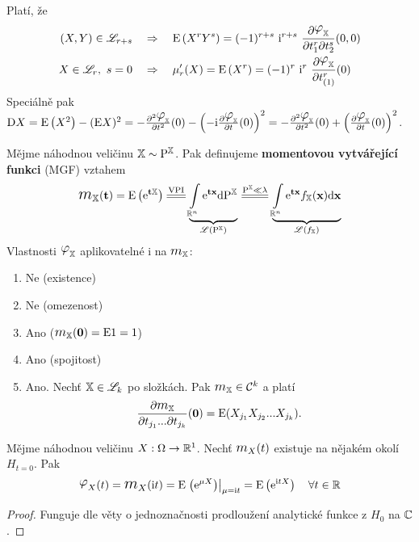 \begin{dusl} Platí, že
	 \[
	\begin{split}
	(X,Y)\in\LL_{r+s}~~~&\Rightarrow~~~\E \left( X^rY^s \right)=(-1)^{r+s}~\mi ^{r+s}~\frac{\partial \lphi_\X}{\partial t_1^r \partial t_2^s}(0,0) \\
	X\in\LL_r,~s=0~~~&\Rightarrow~~~\mu'_r(X)=\E \left( X^r \right)=(-1)^r~\mi^r ~\frac{\partial \lphi_\X}{\partial t_{(1)}^r}(0)
	\end{split}
	\]
	Speciálně pak $ \D X= \E \left( X^2 \right)-(\E X)^2=-\frac{\partial^2 \lphi_\X}{\partial t^2}(0)-\left( -\mi  \frac{\partial \lphi_\X}{\partial t}(0) \right)^2=-\frac{\partial^2 \lphi_\X}{\partial t^2}(0)+\left(  \frac{\partial \lphi_\X}{\partial t}(0) \right)^2 $.
\end{dusl}
\begin{define}
	Mějme náhodnou veličinu $ \mathbb{X}\sim\mathrm{P}^{\mathbb{X}}$. Pak definujeme \textbf{momentovou vytvářející funkci} (MGF) vztahem \[
	\mex(\textbf{t})=\E \left( \me^{\textbf{t}\X} \right)\equal{\text{VPI}}\underbrace{\int\limits_{\R^n}\me^{\textbf{tx}}\dif\PEX}_{\LL(\PEX)}\equal{\PEX\ll\lambda}\underbrace{\int\limits_{\R^n}\me^{\textbf{tx}}\fex(\textbf{x})\dif\textbf{x}}_{\LL(\fex)}
	\]
	Vlastnosti $\lphi_\X$ aplikovatelné i na $\mex$: \begin{enumerate}[	a)]
		\item Ne (existence)
		\item Ne (omezenost)
		\item Ano ($\mex(\textbf{0})=\E 1=1$)
		\item Ano (spojitost)
		\item Ano. Nechť $\mathbb{X}\in\mathscr{L}_k$ po složkách. Pak $\mex\in\mathcal{C}^{k}$ a platí 
		$$ \frac{\partial \mex}{\partial t_{j_1}...\partial t_{j_k}}(\textbf{0})= \E (X_{j_1}X_{j_2}...X_{j_k}). $$
	\end{enumerate}
\end{define}
\begin{theorem}
	Mějme náhodnou veličinu $X:\Omega\to\mathbb{R}^1$. Nechť $\m_X(t)$ existuje na nějakém okolí $H_{t=0}$. Pak \[
	\lphi_X(t)=\m_X(\mi  t)=\E \left.\left( \me^{\mu X} \right)\right|_{\mu=\mi  t}=\E \left( \me^{\mi  tX} \right)~~~\forall t\in\R
	\]
	\begin{proof}
		Funguje dle věty o jednoznačnosti prodloužení analytické funkce z $H_0$ na $\mathbb{C}$.
	\end{proof}
\end{theorem}
